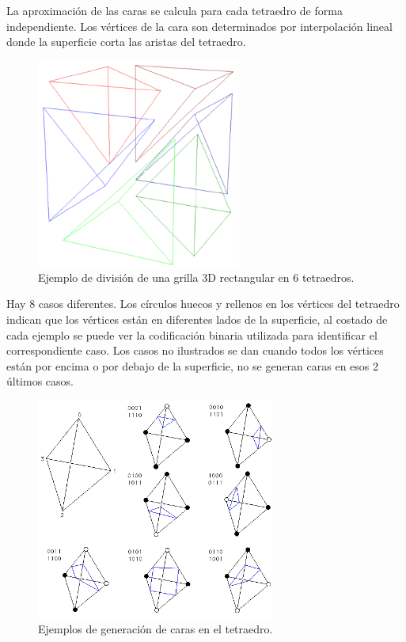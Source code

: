 \documentclass[12pt]{article}
\begin{document}
La aproximación de las caras se calcula para cada tetraedro de forma independiente. Los vértices de la cara son determinados por interpolación lineal donde la superficie corta las aristas del tetraedro.
\begin{figure}[h!]
\includegraphics[width=0.6\textwidth,center]{mt1.png}
\caption{Ejemplo de división de una grilla 3D rectangular en 6 tetraedros.}
\label{6tet}
\end{figure}
\clearpage
Hay 8 casos diferentes. Los círculos huecos y rellenos en los vértices del tetraedro indican que los vértices están en diferentes lados de la superficie, al costado de cada ejemplo se puede ver la codificación binaria utilizada para identificar el correspondiente caso. Los casos no ilustrados se dan cuando todos los vértices están por encima o por debajo de la superficie, no se generan caras en esos 2 últimos casos.
\begin{figure}[h!]
\includegraphics[width=0.7\textwidth,center]{mt2.png}
\caption{Ejemplos de generación de caras en el tetraedro.}
\end{figure}\\
\end{document}
